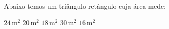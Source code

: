 Abaixo temos um tri\^angulo ret\^angulo cuja \'area mede:

\parbox{0.3\linewidth}{

$24$\,m$^2$
$20$\,m$^2$
$18$\,m$^2$
$30$\,m$^2$
$16$\,m$^2$

}\parbox{0.69\linewidth}{
\begin{center}
\vspace{-6mm}
\vspace{-9mm}
\end{center}
}


